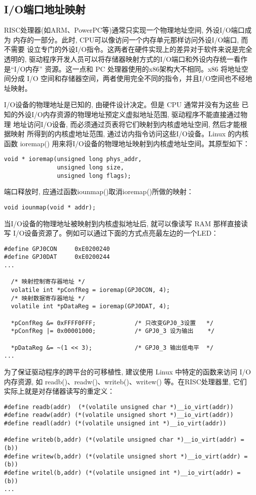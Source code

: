 \subsection{I/O端口地址映射}
RISC处理器(如ARM、PowerPC等)通常只实现一个物理地址空间, 外设I/O端口成为
内存的一部分。此时, CPU可以像访问一个内存单元那样访问外设I/O端口, 而不需要
设立专门的外设I/O指令。这两者在硬件实现上的差异对于软件来说是完全透明的, 
驱动程序开发人员可以将存储器映射方式的I/O端口和外设内存统一看作是``I/O内存''
资源。这一点和 PC 处理器使用的x86架构大不相同。x86 将地址空间分成 I/O
空间和存储器空间，两者使用完全不同的指令，并且I/O空间也不经地址映射。

I/O设备的物理地址是已知的, 由硬件设计决定。但是 CPU 通常并没有为这些
已知的外设I/O内存资源的物理地址预定义虚拟地址范围, 驱动程序不能直接通过物理
地址访问I/O设备, 而必须通过页表将它们映射到内核虚地址空间, 然后才能根据映射
所得到的内核虚地址范围, 通过访内指令访问这些I/O设备。Linux 的内核函数
ioremap() 用来将I/O设备的物理地址映射到内核虚地址空间。其原型如下：
\begin{lstlisting}[numbers=none]
void * ioremap(unsigned long phys_addr,
               unsigned long size,
               unsigned long flags);
\end{lstlisting}

端口释放时, 应通过函数iounmap()取消ioremap()所做的映射：
\begin{lstlisting}[numbers=none]
void iounmap(void * addr);
\end{lstlisting}

当I/O设备的物理地址被映射到内核虚拟地址后, 就可以像读写 RAM 那样直接读写
I/O设备资源了。例如可以通过下面的方式点亮最左边的一个LED：
\begin{lstlisting}
#define	GPJ0CON		0xE0200240
#define	GPJ0DAT		0xE0200244
...

  /* 映射控制寄存器地址 */
  volatile int *pConfReg = ioremap(GPJ0CON, 4);
  /* 映射数据寄存器地址 */
  volatile int *pDataReg = ioremap(GPJ0DAT, 4);

  *pConfReg &= 0xFFFF0FFF;           /* 只改变GPJ0_3设置   */
  *pConfReg |= 0x00001000;           /* GPJ0_3 设为输出    */

  *pDataReg &= ~(1 << 3);            /* GPJ0_3 输出低电平  */
...
\end{lstlisting}
	
为了保证驱动程序的跨平台的可移植性, 建议使用 Linux 中特定的函数来访问
I/O 内存资源, 如 readb()、readw()、writeb()、writew() 等。在RISC处理器里, 
它们实际上就是对存储器读写的重定义：
\begin{verbatim}
#define readb(addr)  (*(volatile unsigned char *)__io_virt(addr))
#define readw(addr) (*(volatile unsigned short *)__io_virt(addr))
#define readl(addr) (*(volatile unsigned int *)__io_virt(addr))

#define writeb(b,addr) (*(volatile unsigned char *)__io_virt(addr) = (b))
#define writew(b,addr) (*(volatile unsigned short *)__io_virt(addr) = (b))
#define writel(b,addr) (*(volatile unsigned int *)__io_virt(addr) = (b))
...
\end{verbatim}


